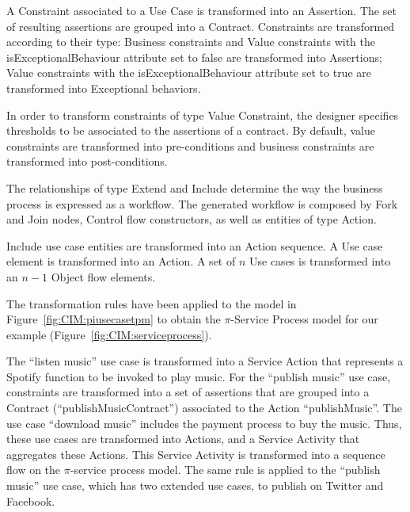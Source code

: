 \documentclass{singlecol-new}
\theoremstyle{TH}{
\newtheorem{lemma}{Lemma}
\newtheorem{theorem}[lemma]{Theorem}
\newtheorem{corrolary}[lemma]{Corrolary}
\newtheorem{conjecture}[lemma]{Conjecture}
\newtheorem{proposition}[lemma]{Proposition}
\newtheorem{claim}[lemma]{Claim}
\newtheorem{stheorem}[lemma]{Wrong Theorem}
\newtheorem{algorithm}{Algorithm}
}
\theoremstyle{THrm}{
\newtheorem{definition}{Definition}[section]
\newtheorem{question}{Question}[section]
\newtheorem{remark}{Remark}
\newtheorem{scheme}{Scheme}
}
\theoremstyle{THhit}{
\newtheorem{case}{Case}[section]
}
\theoremstyle{THhsl}{
\newtheorem{example}{Example}
}
\begin{document}
%
A {\sf Constraint} associated to a {\sf Use Case}  is transformed into an  {\sf Assertion}.  
The set of resulting assertions  are grouped into a {\sf Contract}.
Constraints are transformed according to their type:
{\sc Business} constraints and {\sc Value} constraints with the {\sf  isExceptionalBehaviour} at\-tri\-bute set to false are transformed into {\sf Assertion}s;
{\sc Value } constraints with the {\sf  isExceptionalBehaviour} attribute set to true are transformed into {\sf Exceptional behavior}s.

In order to transform constraints of type {\sf Value Constraint}, the designer specifies thresholds to be associated to the assertions of a contract.
By default, value constraints are transformed into pre-conditions and business constraints are transformed into post-conditions. 
  
The relationships of type  {\sc Extend} and {\sc Include}  determine the way the business process is expressed as a workflow.  
The generated workflow is composed by {\sf Fork} and {\sf Join} nodes,  {\sc Control flow} constructors, as well as entities of type {\sc Action}.

{\sf Include} use case entities are transformed into an {\sf Action} sequence.
A {\sc Use case} element is transformed into an {\sf Action}. 
A set of $n$ {\sc Use cases} is transformed into an  $n-1$ {\sf Object flow} elements. 
%

\begin{example}\label{ex:toPublicMusicT1} 
The transformation rules have been applied to the model in Figure~\ref{fig:CIM:piusecasetpm} to obtain the $\pi$-Service Process model for our example (Figure~\ref{fig:CIM:serviceprocess}).



The ``listen music'' use case is transformed into a Service Action that  represents a Spotify  function to be invoked to play music. 
For the ``publish music'' use case,  constraints are transformed into a set of assertions that are grouped into a Contract ({\sf ``publishMusicContract''}) associated to the Action {\sf ``publishMusic''}. 
The use case ``download music''  includes the payment process to buy the music. 
Thus, these use cases  are transformed into {\sf Actions}, and a {\sf Service Activity} that aggregates these {\sf Actions}.   
This \textsf{Service Activity} is transformed into a sequence flow on the $\pi$-service process model.
The same rule is applied to the ``publish music'' use case, which has two extended use cases, to publish on Twitter and Facebook.
 \end{example}
\end{document}
